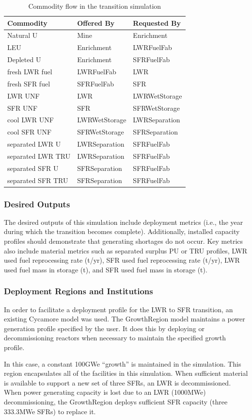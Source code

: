 \begin{table}[htbp]
\centering
\begin{tabular}{|l|l|l|}
\hline
Commodity  &     Offered By  &    Requested By \\
\hline
Natural  U & Mine & Enrichment \\ 
LEU & Enrichment & LWRFuelFab \\ 
Depleted U & Enrichment & SFRFuelFab \\ 
fresh LWR fuel & LWRFuelFab & LWR \\ 
fresh SFR fuel & SFRFuelFab & SFR \\ 
LWR UNF & LWR & LWRWetStorage \\ 
SFR UNF & SFR & SFRWetStorage \\ 
cool LWR UNF & LWRWetStorage & LWRSeparation \\ 
cool SFR UNF & SFRWetStorage & SFRSeparation \\ 
separated LWR U & LWRSeparation & SFRFuelFab \\ 
separated LWR TRU & LWRSeparation & SFRFuelFab \\ 
separated SFR U & SFRSeparation & SFRFuelFab \\ 
separated SFR TRU & SFRSeparation & SFRFuelFab \\ 
\hline
\end{tabular}
\caption{Commodity flow in the transition simulation}
\label{tab:commods}
\end{table}

\subsubsection{Desired Outputs}

The desired outputs of this simulation include deployment metrics (i.e., the 
year during which the transition becomes complete). Additionally, installed 
capacity profiles should demonstrate that generating shortages do not occur. 
Key metrics also include material metrics such as separated surplus PU or TRU 
profiles, LWR used fuel reprocessing rate (t/yr), \gls{SFR} used fuel reprocessing 
rate (t/yr),  \gls{LWR} used fuel mass in storage (t), and \gls{SFR} used fuel mass in 
storage (t).

\subsubsection{Deployment Regions and Institutions}

In order to facilitate a deployment profile for the \gls{LWR} to \gls{SFR} transition, an 
existing Cycamore model was used. The GrowthRegion model maintains a 
power generation profile specified by the user. It does this by deploying or 
decommissioning reactors when necessary to maintain the specified growth 
profile.  

In this case, a constant 100GWe ``growth'' is maintained in the simulation. 
This region encapsulates all of the facilities in this simulation. 
When sufficient material is available to support a new set of three SFRs, an 
LWR is decommissioned. When power generating capacity is lost due to an LWR 
(1000MWe) decommissioning, the GrowthRegion deploys sufficient SFR capacity 
(three 333.3MWe SFRs) to replace it. 

